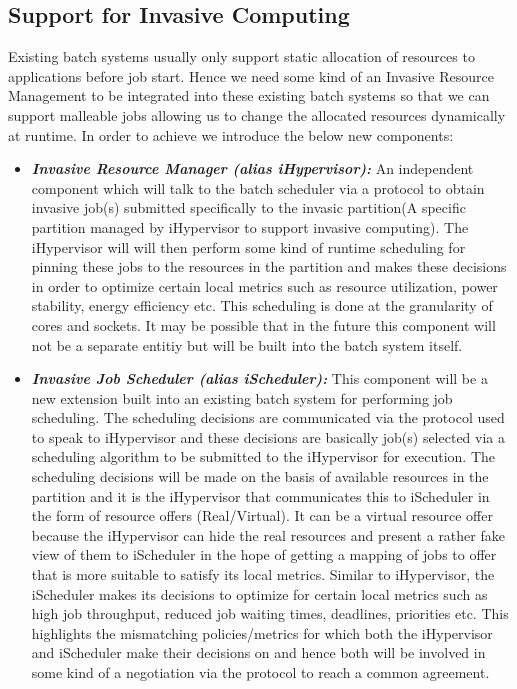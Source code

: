 \documentclass{acm_proc_article-sp}
\begin{document}
\subsection{Support for Invasive Computing}
Existing batch systems usually only support static allocation of resources to applications before job start. Hence we need some kind of an Invasive Resource Management to be integrated into these existing batch systems so that we can support malleable jobs allowing us to change the allocated resources dynamically at runtime. In order to achieve we introduce the below new components:\par
\begin{itemize}
\item \textbf{\textit{Invasive Resource Manager (alias iHypervisor):}} An independent component which will talk to the batch scheduler via a protocol to obtain invasive job(s) submitted specifically to the invasic partition(A specific partition managed by iHypervisor to support invasive computing). The iHypervisor will will then perform some kind of runtime scheduling for pinning these jobs to the resources in the partition and makes these decisions in order to optimize certain local metrics such as resource utilization, power stability, energy efficiency etc. This scheduling is done at the granularity of cores and sockets. It may be possible that in the future this component will not be a separate entitiy but will be built into the batch system itself.
\item \textbf{\textit{Invasive Job Scheduler (alias iScheduler):}} This component will be a new extension built into an existing batch system for performing job scheduling. The scheduling decisions are communicated via the protocol used to speak to iHypervisor and these decisions are basically job(s) selected via a scheduling algorithm to be submitted to the iHypervisor for execution. The scheduling decisions will be made on the basis of available resources in the partition and it is the iHypervisor that communicates this to iScheduler in the form of resource offers (Real/Virtual). It can be a virtual resource offer because the iHypervisor can hide the real resources and present a rather fake view of them to iScheduler in the hope of getting a mapping of jobs to offer that is more suitable to satisfy its local metrics. Similar to iHypervisor, the iScheduler makes its decisions to optimize for certain local metrics such as high job throughput, reduced job waiting times, deadlines, priorities etc. This highlights the mismatching policies/metrics for which both the iHypervisor and iScheduler make their decisions on and hence both will be involved in some kind of a negotiation via the protocol to reach a common agreement.

\end{itemize}
\end{document}
